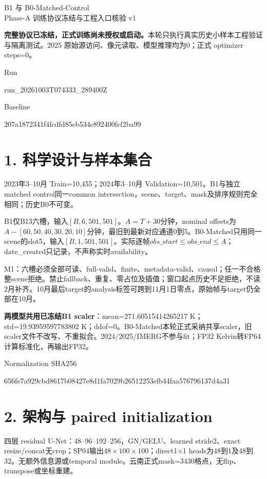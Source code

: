\documentclass[10pt,a4paper,fontset=windows]{ctexart}
\begin{document}
\begin{center}{\Large B1 与 B0-Matched-Control}\\[5pt]
{\large Phase-A 训练协议冻结与工程入口核验 v1}\end{center}
\textbf{完整协议已冻结，正式训练尚未授权或启动。}本轮只执行真实历史小样本工程验证与隔离测试。2025 原始源访问、像元读取、模型推理均为0；正式 optimizer steps=0。
\par\noindent Run\par{\small\ttfamily run\_20261003T074333\_289400Z}\par
\par\noindent Baseline\par{\small\ttfamily 207a1872341f4fcdfd85eb534c892400fcf2ba99}\par
\section*{1. 科学设计与样本集合}
2023年3--10月 Train=10,455；2024年3--10月 Validation=10,501。B1与独立matched control同一common intersection，scene、target、mask及排序规则完全相同；历史B0不可变。

B1仅B13六槽，输入$[B,6,501,501]$。$A=T+30$分钟，nominal offsets为$A-[60,50,40,30,20,10]$分钟，最旧到最新对应通道0到5。B0-Matched只用同一scene的slot5，输入$[B,1,501,501]$。实际逐帧$obs\_start\le obs\_end\le A$；date\_created只记录，不声称实时availability。

M1：六槽必须全部可读、full-valid、finite、metadata-valid、causal；任一不合格整scene拒绝。禁止fallback、重复、零占位及插值；窗口起点历史不足拒绝，不读2月补齐。10月最后target的analysis标签可跨到11月1日零点，原始帧与target仍全部在10月。

\textbf{两模型共用已冻结B1 scaler}：mean=271.60515414265217 K；std=19.93959597783802 K；ddof=0。B0-Matched本轮正式采纳共享scaler，旧scaler文件不改写、不重拟合。2024/2025/IMERG不参与fit；FP32 Kelvin转FP64计算标准化，再输出FP32。
\par\noindent Normalization SHA256\par{\small\ttfamily 656fe7a929cbd8617b08427e8d1fa7029b26512253efb44faa576796137d4a31}\par
\section*{2. 架构与 paired initialization}
四层 residual U-Net：48--96--192--256，GN/GELU、learned stride2、exact resize/concat无crop；SP04输出$48\times100\times100$；direct1$\times$1 heads为48到1及48到32。无额外信息源或temporal module。云南正式mask=3430格点，无flip、transpose或坐标重建。
\end{document}
